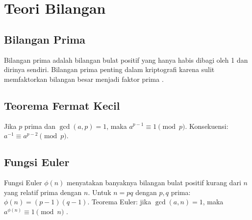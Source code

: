 \section{Teori Bilangan}

\subsection{Bilangan Prima}
Bilangan prima adalah bilangan bulat positif yang hanya habis dibagi oleh 1 dan dirinya sendiri. Bilangan prima penting dalam kriptografi karena sulit memfaktorkan bilangan besar menjadi faktor prima \cite{trappe2006,stinson2018,menezes1996}.

\subsection{Teorema Fermat Kecil}
Jika $p$ prima dan $\gcd(a, p) = 1$, maka $a^{p-1} \equiv 1 \pmod{p}$. Konsekuensi: $a^{-1} \equiv a^{p-2} \pmod{p}$.

\subsection{Fungsi Euler}
Fungsi Euler $\phi(n)$ menyatakan banyaknya bilangan bulat positif kurang dari $n$ yang relatif prima dengan $n$. Untuk $n = pq$ dengan $p, q$ prima: $\phi(n) = (p-1)(q-1)$. Teorema Euler: jika $\gcd(a, n) = 1$, maka $a^{\phi(n)} \equiv 1 \pmod{n}$ \cite{trappe2006,stinson2018,menezes1996}.
